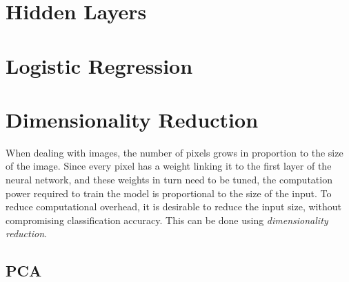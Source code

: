\section{Hidden Layers}
\section{Logistic Regression}


\section{Dimensionality Reduction}
When dealing with images, the number of pixels grows in proportion to the size of the image. Since every pixel has a weight linking it to the first layer of the neural network, and these weights in turn need to be tuned, the computation power required to train the model is proportional to the size of the input. To reduce computational overhead, it is desirable to reduce the input size, without compromising classification accuracy. This can be done using \textit{dimensionality reduction}.
\subsection{PCA}\label{lit:PCA}


